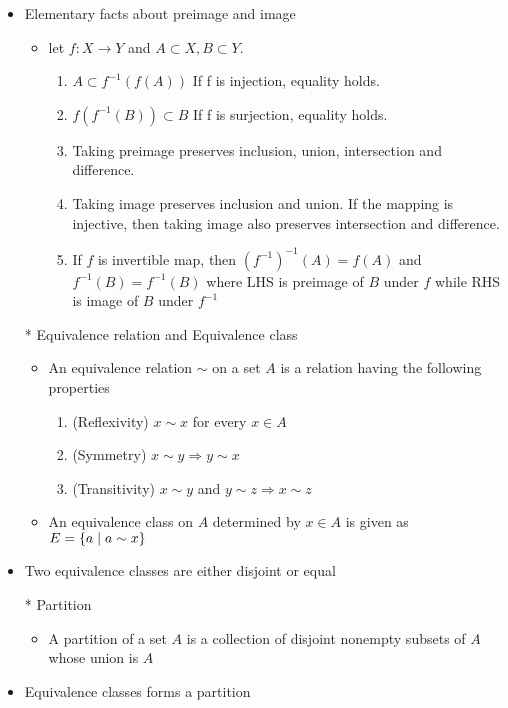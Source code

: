 \documentclass[12pt]{article}
\newcommand{\spone}{\hspace{0.1cm}}
\begin{document}
\begin{itemize}
	\item Elementary facts about preimage and image
	\begin{itemize}
		\item let $f: X\rightarrow Y$ and $A\subset X, B\subset Y$.
		\begin{enumerate}
			\item $A\subset f^{-1}(f(A))$ \quad If f is injection, equality holds.
			\item $f(f^{-1}(B))\subset B$ \quad If f is surjection, equality holds.
			\item Taking preimage preserves inclusion, union, intersection and difference.
			\item Taking image preserves inclusion and union. If the mapping is injective, then taking image also preserves intersection and difference.
			\item If $f$ is invertible map, then $(f^{-1})^{-1}(A)=f(A)$ and $f^{-1}(B)=f^{-1}(B)$ where LHS is preimage of $B$ under $f$ while RHS is image of $B$ under $f^{-1}$
		\end{enumerate}
	\end{itemize}
	\item[*] Equivalence relation and Equivalence class
	\begin{itemize}
		\item An equivalence relation $\sim$ on a set $A$ is a relation having the following properties
		\begin{enumerate}
			\item (Reflexivity) $x\sim x$ for every $x\in A$
			\item (Symmetry) $x\sim y \Rightarrow y\sim x$
			\item (Transitivity) $x\sim y$ and $y\sim z \Rightarrow x\sim z$
		\end{enumerate}
		\item An equivalence class on $A$ determined by $x \in A$ is given as $E=\{a \spone |\spone a\sim x\}$
	\end{itemize}
	\item Two equivalence classes are either disjoint or equal
	\item[*] Partition
	\begin{itemize}
		\item A partition of a set $A$ is a collection of disjoint nonempty subsets of $A$\\ whose union is $A$
	\end{itemize}
	\item Equivalence classes forms a partition

\end{itemize}
\end{document}
